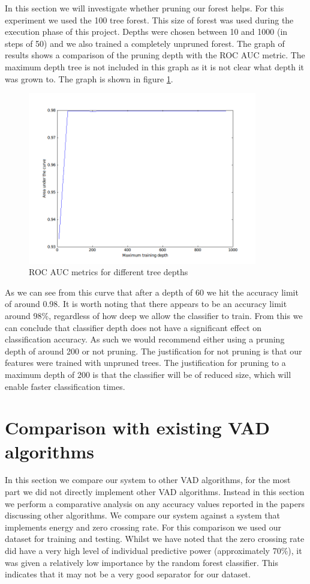 \documentclass[ %
                    author={Sam Phippen},
                supervisor={Dr. Rafal Bogacz},
                     title={Real time voice activity detectors in noisy personal computing environments},
                  subtitle={},
                    degree={MEng},
                      year={2012} ]{thesis}
\begin{document}
In this section we will investigate whether pruning our forest helps. For this
experiment we used the 100 tree forest. This size of forest was used during the
execution phase of this project. Depths were chosen between 10 and 1000 (in
steps of 50) and we also trained a completely unpruned forest. The graph of
results shows a comparison of the pruning depth with the ROC AUC metric. The
maximum depth tree is not included in this graph as it is not clear what depth
it was grown to.  The graph is shown in figure \ref{fig:roc-depths}.

\begin{figure}
    \includegraphics[width=10cm]{roc_differing_depth.png}

    \caption{ROC AUC metrics for different tree depths}
    \label{fig:roc-depths}
\end{figure}

As we can see from this curve that after a depth of 60 we hit the accuracy
limit of around 0.98. It is worth noting that there appears to be an accuracy
limit around 98\%, regardless of how deep we allow the classifier to train.
From this we can conclude that classifier depth does not have a significant
effect on classification accuracy. As such we would recommend either using a
pruning depth of around 200 or not pruning. The justification for not pruning
is that our features were trained with unpruned trees. The justification for
pruning to a maximum depth of 200 is that the classifier will be of reduced
size, which will enable faster classification times.

\section{Comparison with existing VAD algorithms}

In this section we compare our system to other VAD algorithms, for the most
part we did not directly implement other VAD algorithms. Instead in this
section we perform a comparative analysis on any accuracy values reported in
the papers discussing other algorithms. We compare our system against a system
that implements energy and zero crossing rate. For this comparison we used our
dataset for training and testing. Whilst we have noted that the zero crossing
rate did have a very high level of individual predictive power (approximately
70\%), it was given a relatively low importance by the random forest
classifier.  This indicates that it may not be a very good separator for our
dataset.
\end{document}
